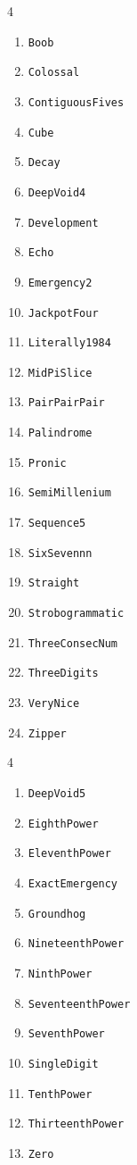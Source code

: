 \begin{multicols}4
    \begin{enumerate}
        \item \texttt{Boob}
        \item \texttt{Colossal}
        \item \texttt{ContiguousFives}
        \item \texttt{Cube}
        \item \texttt{Decay}
        \item \texttt{DeepVoid4}
        \item \texttt{Development}
        \item \texttt{Echo}
        \item \texttt{Emergency2}
        \item \texttt{JackpotFour}
        \item \texttt{Literally1984}
        \item \texttt{MidPiSlice}
        \item \texttt{PairPairPair}
        \item \texttt{Palindrome}
        \item \texttt{Pronic}
        \item \texttt{SemiMillenium}
        \item \texttt{Sequence5}
        \item \texttt{SixSevennn}
        \item \texttt{Straight}
        \item \texttt{Strobogrammatic}
        \item \texttt{ThreeConsecNum}
        \item \texttt{ThreeDigits}
        \item \texttt{VeryNice}
        \item \texttt{Zipper}
    \end{enumerate}
\end{multicols}

\begin{multicols}4
    \begin{enumerate}
        \item \texttt{DeepVoid5}
        \item \texttt{EighthPower}
        \item \texttt{EleventhPower}
        \item \texttt{ExactEmergency}
        \item \texttt{Groundhog}
        \item \texttt{NineteenthPower}
        \item \texttt{NinthPower}
        \item \texttt{SeventeenthPower}
        \item \texttt{SeventhPower}
        \item \texttt{SingleDigit}
        \item \texttt{TenthPower}
        \item \texttt{ThirteenthPower}
        \item \texttt{Zero}
    \end{enumerate}
\end{multicols}

